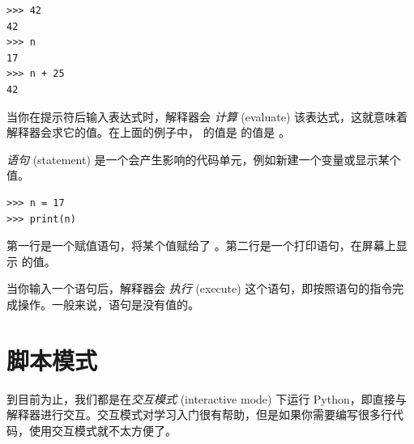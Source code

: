 \begin{lstlisting}
>>> 42
42
>>> n
17
>>> n + 25
42
\end{lstlisting}

%

当你在提示符后输入表达式时，解释器会 {\em 计算} (evaluate) 该表达式，这就意味着解释器会求它的值。在上面的例子中， 的值是  的值是 。

{\em 语句} (statement) 是一个会产生影响的代码单元，例如新建一个变量或显示某个值。

\begin{lstlisting}
>>> n = 17
>>> print(n)
\end{lstlisting}

%

第一行是一个赋值语句，将某个值赋给了 。第二行是一个打印语句，在屏幕上显示  的值。

当你输入一个语句后，解释器会 {\em 执行} (execute) 这个语句，即按照语句的指令完成操作。一般来说，语句是没有值的。

\section{脚本模式}


到目前为止，我们都是在{\em 交互模式} (interactive mode) 下运行 Python，即直接与解释器进行交互。交互模式对学习入门很有帮助，但是如果你需要编写很多行代码，使用交互模式就不太方便了。


